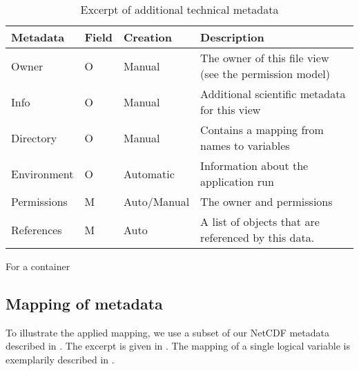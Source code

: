 \begin{table}
	\begin{subtable}[t]{\textwidth}
		\begin{tabular}{llll}
			Metadata & Field & Creation & Description\\
			\hline
			Owner    & O     & Manual   & The owner of this file view (see the permission model)\\
			Info     & O     & Manual   & Additional scientific metadata for this view\\
			Directory & O    & Manual   & Contains a mapping from names to variables\\
			Environment & O  & Automatic & Information about the application run\\
			Permissions & M & Auto/Manual & The owner and permissions \\
			References  & M & Auto & A list of objects that are referenced by this data.
		\end{tabular}
		\caption{For a container}
	\end{subtable}
	\caption{Excerpt of additional technical metadata}
	\label{tbl:additionalTechnicalMetadata}
\end{table}



%











\subsection{Mapping of metadata}

To illustrate the applied mapping, we use a subset of our NetCDF metadata described in .
The excerpt is given in .
The mapping of a single logical variable is exemplarily described in .


